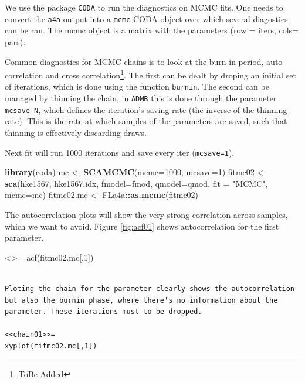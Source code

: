 \documentclass[
]{book}
\newenvironment{Shaded}{\begin{snugshade}}{\end{snugshade}}
\newcommand{\AttributeTok}[1]{\textcolor[rgb]{0.13,0.29,0.53}{#1}}
\newcommand{\DecValTok}[1]{\textcolor[rgb]{0.00,0.00,0.81}{#1}}
\newcommand{\FunctionTok}[1]{\textcolor[rgb]{0.13,0.29,0.53}{\textbf{#1}}}
\newcommand{\NormalTok}[1]{#1}
\newcommand{\OtherTok}[1]{\textcolor[rgb]{0.56,0.35,0.01}{#1}}
\newcommand{\SpecialCharTok}[1]{\textcolor[rgb]{0.81,0.36,0.00}{\textbf{#1}}}
\newcommand{\StringTok}[1]{\textcolor[rgb]{0.31,0.60,0.02}{#1}}
\begin{document}
We use the package \texttt{CODA} to run the diagnostics on MCMC fits. One needs to convert the \texttt{a4a} output into a \texttt{mcmc} CODA object over which several diagostics can be ran. The mcmc object is a matrix with the parameters (row = iters, cols= pars).

Common diagnostics for MCMC chains is to look at the burn-in period, auto-correlation and cross correlation\footnote{ToBe Added}. The first can be dealt by droping an initial set of iterations, which is done using the function \texttt{burnin}. The second can be managed by thinning the chain, in \texttt{ADMB} this is done through the parameter \texttt{mcsave\ N}, which defines the iteration's saving rate (the inverse of the thinning rate). This is the rate at which samples of the parameters are saved, such that thinning is effectively discarding draws.

Next fit will run 1000 iterations and save every iter (\texttt{mcsave=1}).

\begin{Shaded}
\begin{Highlighting}[]
\FunctionTok{library}\NormalTok{(coda)}
\NormalTok{mc }\OtherTok{\textless{}{-}} \FunctionTok{SCAMCMC}\NormalTok{(}\AttributeTok{mcmc=}\DecValTok{1000}\NormalTok{, }\AttributeTok{mcsave=}\DecValTok{1}\NormalTok{)}
\NormalTok{fitmc02 }\OtherTok{\textless{}{-}} \FunctionTok{sca}\NormalTok{(hke1567, hke1567.idx, }\AttributeTok{fmodel=}\NormalTok{fmod, }\AttributeTok{qmodel=}\NormalTok{qmod, }\AttributeTok{fit =} \StringTok{"MCMC"}\NormalTok{, }\AttributeTok{mcmc=}\NormalTok{mc)}
\NormalTok{fitmc02.mc }\OtherTok{\textless{}{-}}\NormalTok{ FLa4a}\SpecialCharTok{::}\FunctionTok{as.mcmc}\NormalTok{(fitmc02)}
\end{Highlighting}
\end{Shaded}

The autocorrelation plots will show the very strong correlation across samples, which we want to avoid. Figure \ref{fig:acf01} shows autocorrelation for the first parameter.

\textless{}\textgreater=
acf(fitmc02.mc{[},1{]})

\begin{verbatim}

Ploting the chain for the parameter clearly shows the autocorrelation but also the burnin phase, where there's no information about the parameter. These iterations must to be dropped. 

<<chain01>>=
xyplot(fitmc02.mc[,1])
\end{verbatim}
\end{document}
